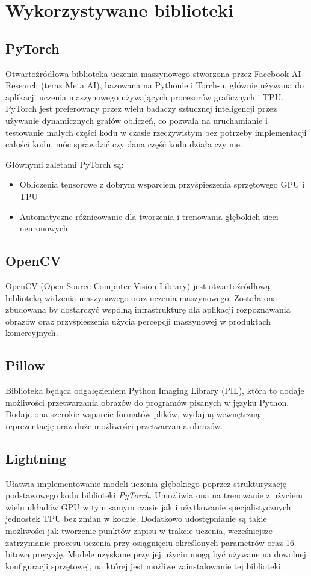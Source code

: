 \section{Wykorzystywane biblioteki}

\subsection*{PyTorch}
Otwartoźródłowa biblioteka uczenia maszynowego stworzona przez Facebook AI Research (teraz Meta AI), bazowana na Pythonie i Torch-u, głównie używana do aplikacji uczenia maszynowego używających procesorów graficznych i TPU. PyTorch jest preferowany przez wielu badaczy sztucznej inteligencji przez używanie dynamicznych grafów obliczeń, co pozwala na uruchamianie i testowanie małych części kodu w czasie rzeczywistym bez potrzeby implementacji całości kodu, móc sprawdzić czy dana część kodu działa czy nie.

Głównymi zaletami PyTorch są:
\begin{itemize}
	\item Obliczenia tensorowe z dobrym wsparciem przyśpieszenia sprzętowego GPU i TPU
	\item Automatyczne różnicowanie dla tworzenia i trenowania głębokich sieci neuronowych
\end{itemize}

\subsection*{OpenCV}
OpenCV (Open Source Computer Vision Library) jest otwartoźródłową biblioteką widzenia maszynowego oraz uczenia maszynowego. Została ona zbudowana by dostarczyć wspólną infrastrukturę dla aplikacji rozpoznawania obrazów oraz przyśpieszenia użycia percepcji maszynowej w produktach komercyjnych.

\subsection*{Pillow}
Biblioteka będąca odgałęzieniem Python Imaging Library (PIL), która to dodaje możliwości przetwarzania obrazów do programów pisanych w języku Python. Dodaje ona szerokie wsparcie formatów plików, wydajną wewnętrzną reprezentację oraz duże możliwości przetwarzania obrazów. 

\subsection*{Lightning}
Ułatwia implementowanie modeli uczenia głębokiego poprzez strukturyzację podstawowego kodu biblioteki \textit{PyTorch}. Umożliwia ona na trenowanie z użyciem wielu układów GPU w tym samym czasie jak i użytkowanie specjalistycznych jednostek TPU bez zmian w kodzie. Dodatkowo udostępnianie są takie możliwości jak tworzenie punktów zapisu w trakcie uczenia, wcześniejsze zatrzymanie procesu uczenia przy osiągnięciu określonych parametrów oraz 16 bitową precyzję. Modele uzyskane przy jej użyciu mogą być używane na dowolnej konfiguracji sprzętowej, na której jest możliwe zainstalowanie tej biblioteki. 